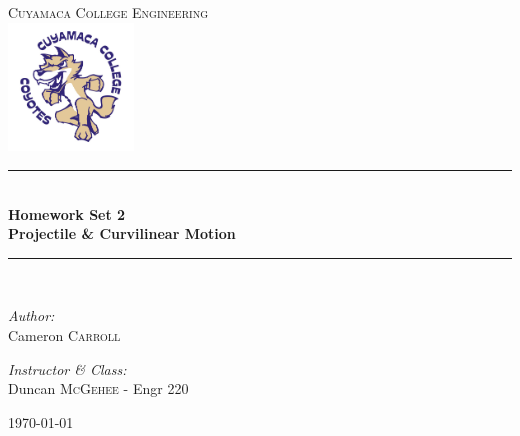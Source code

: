 \documentclass[11pt,letterpaper]{report}
\newcommand{\HRule}{\rule{\linewidth}{0.5mm}}
\begin{document}
\begin{titlepage}
\begin{center}

\textsc{\Large Cuyamaca College Engineering}\\[0.5cm]
\includegraphics[width=0.25\textwidth]{./clogo.jpg}

\HRule \\[0.4cm]
{ \LARGE \bfseries Homework Set 2}\\[0.5cm]
{ \large \bfseries Projectile \& Curvilinear Motion}\\[0.5cm]

\HRule \\[1.5cm]

\begin{minipage}{0.4\textwidth}
\begin{flushleft} \large
\emph{Author:}\\
Cameron \textsc{Carroll}\\[0.2cm]

\end{flushleft}
\end{minipage}
\begin{minipage}{0.4\textwidth}
\begin{flushright} \large
\emph{Instructor \& Class:}\\
Duncan \textsc{McGehee} - Engr 220
\end{flushright}
\end{minipage}

\vfill

{\large \today}

\end{center}
\end{titlepage}
\end{document}
